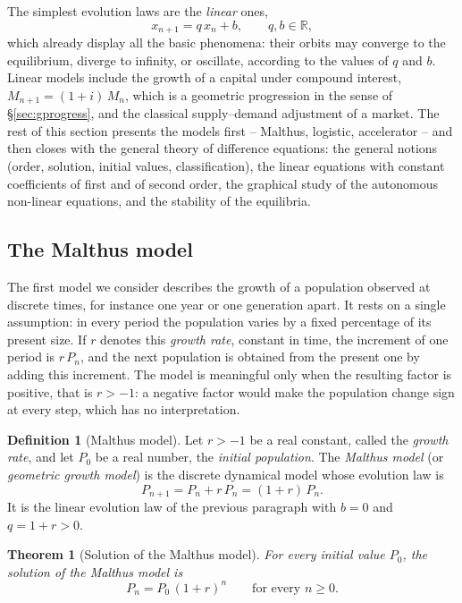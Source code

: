 \documentclass[11pt,a4paper]{article}
\theoremstyle{definition} \newtheorem{definition}{Definition} \theoremstyle{plain} \newtheorem{theorem}{Theorem}
\begin{document}
The simplest evolution laws are the \emph{linear} ones,
\[ x_{n+1} = q\,x_n + b, \qquad q, b \in \mathbb{R}, \]
which already display all the basic phenomena: their orbits may converge to
the equilibrium, diverge to infinity, or oscillate, according to the values
of $q$ and $b$. Linear models include the growth of a capital under
compound interest, $M_{n+1} = (1+i)\,M_n$, which is a geometric progression
in the sense of \S\ref{sec:gprogress}, and the classical supply--demand adjustment of a
market. The rest of this section presents the models first -- Malthus, logistic, accelerator -- and then closes with the general theory of difference equations: the general notions (order, solution, initial values, classification), the linear equations with constant coefficients of first and of second order, the graphical study of the autonomous non-linear equations, and the stability of the equilibria.

\subsection{The Malthus model}

The first model we consider describes the growth of a population observed
at discrete times, for instance one year or one generation apart. It rests
on a single assumption: in every period the population varies by a fixed
percentage of its present size. If $r$ denotes this \emph{growth rate},
constant in time, the increment of one period is $r\,P_n$, and the next
population is obtained from the present one by adding this increment. The
model is meaningful only when the resulting factor is positive, that is
$r > -1$: a negative factor would make the population change sign at every
step, which has no interpretation.

\begin{definition}[Malthus model] Let $r > -1$ be a real constant, called
the \emph{growth rate}, and let $P_0$ be a real number, the \emph{initial
population}. The \emph{Malthus model} (or \emph{geometric growth model})
is the discrete dynamical model whose evolution law is
\[ P_{n+1} = P_n + r\,P_n = (1+r)\,P_n. \]
It is the linear evolution law of the previous paragraph with $b=0$ and
$q=1+r>0$. \end{definition}

\begin{theorem}[Solution of the Malthus model]\label{thm:malthus} For every initial value
$P_0$, the solution of the Malthus model is
\[ P_n = P_0\,(1+r)^n \qquad\text{for every } n \ge 0. \]
\end{theorem}
\end{document}
